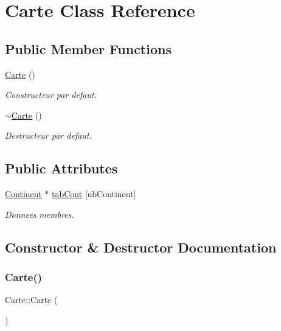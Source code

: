 \hypertarget{classCarte}{}\section{Carte Class Reference}
\label{classCarte}
\subsection*{Public Member Functions}
\begin{DoxyCompactItemize}
\item 
\mbox{\hyperlink{classCarte_a06daaca86c31c80f8308f4a81d46dc9b}{Carte}} ()
\begin{DoxyCompactList}\small\item\em Constructeur par defaut. \end{DoxyCompactList}\item 
\mbox{\hyperlink{classCarte_a63300ff55c58b5d5b1674a3fc8f25910}{$\sim$\+Carte}} ()
\begin{DoxyCompactList}\small\item\em Destructeur par defaut. \end{DoxyCompactList}\end{DoxyCompactItemize}
\subsection*{Public Attributes}
\begin{DoxyCompactItemize}
\item 
\mbox{\hyperlink{classContinent}{Continent}} $\ast$ \mbox{\hyperlink{classCarte_a327521a757eb3b89e961e4d6bc9a4d7a}{tab\+Cont}} \mbox{[}nb\+Continent\mbox{]}
\begin{DoxyCompactList}\small\item\em Donnees membres. \end{DoxyCompactList}\end{DoxyCompactItemize}


\subsection{Constructor \& Destructor Documentation}
\mbox{\label{classCarte_a06daaca86c31c80f8308f4a81d46dc9b}} 
\subsubsection{\texorpdfstring{Carte()}{Carte()}}
{\footnotesize\ttfamily Carte\+::\+Carte (\begin{DoxyParamCaption}{ }\end{DoxyParamCaption})}



